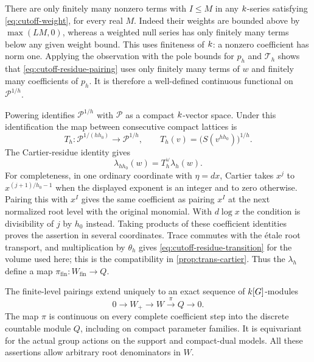 There are only finitely many nonzero terms with $I\leq M$ in any
$k$-series satisfying \cref{eq:cutoff-weight}, for every real $M$.
Indeed their weights are bounded above by $\max(LM,0)$, whereas a
weighted null series has only finitely many terms below any given
weight bound.  This uses finiteness of $k$: a nonzero coefficient
has norm one.  Applying the observation with the pole bounds for
$p_h$ and $\mathcal T_h$ shows that
\cref{eq:cutoff-residue-pairing} uses only finitely many terms of $w$
and finitely many coefficients of $p_h$.  It is therefore a
well-defined continuous functional on $\mathcal P^{1/h}$.

Powering identifies $\mathcal P^{1/h}$ with $\mathcal P$ as a
compact $k$-vector space.  Under this identification the map
between consecutive compact lattices is
\[
 T_h:\mathcal P^{1/(h h_0)}\longrightarrow\mathcal P^{1/h},
 \qquad T_h(v)=\bigl(S(v^{h h_0})\bigr)^{1/h}.
\]
The Cartier-residue identity gives
\begin{equation}
 \lambda_{h h_0}(w)=T_h^\vee\lambda_h(w).
 \label{eq:cutoff-residue-transition}
\end{equation}
For completeness, in one ordinary coordinate with $\eta=dx$, Cartier
takes $x^j$ to $x^{(j+1)/h_0-1}$ when the displayed exponent is an
integer and to zero otherwise.  Pairing this with $x^I$ gives the same
coefficient as pairing $x^I$ at the next normalized root level with
the original monomial.  With $d\log x$ the condition is divisibility
of $j$ by $h_0$ instead.  Taking products of these coefficient
identities proves the assertion in several coordinates.  Trace
commutes with the étale root transport, and multiplication by
$\theta_h$ gives \cref{eq:cutoff-residue-transition} for the volume
used here; this is the compatibility in
\cref{prop:trans-cartier}.  Thus the $\lambda_h$ define a map
$\pi_{\mathrm{fin}}:W_{\mathrm{fin}}\to Q$.

\begin{proposition}
\label{prop:cutoff-residue}
The finite-level pairings extend uniquely to an exact sequence of
$k[G]$-modules
\begin{equation}
 0\longrightarrow W_+\longrightarrow W
   \xrightarrow{\ \pi\ }Q\longrightarrow0.
 \label{eq:cutoff-residue-sequence}
\end{equation}
The map $\pi$ is continuous on every complete coefficient step into
the discrete countable module $Q$, including on compact parameter
families.  It is equivariant for the actual group actions on the
support and compact-dual models.  All these assertions allow
arbitrary root denominators in $W$.
\end{proposition}

